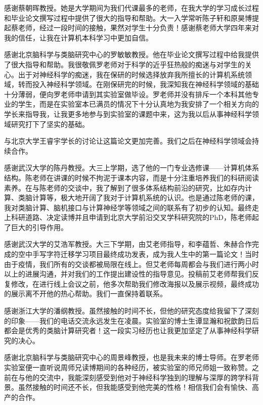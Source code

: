 
\begin{acknowledgements}
  感谢蔡朝晖教授。她是大学期间为我们代课最多的老师，在我大学的学习成长过程和毕业论文撰写过程中提供了很大的指导和帮助。大一入学常听陈子轩和原昊博提起蔡老师，经过一段时间的接触，果然对学生十分负责！感谢蔡老师大学四年来对我的信任，让我在计算机本科学习中更加自信。

  感谢北京脑科学与类脑研究中心的罗敏敏教授。他在毕业论文撰写过程中给我提供了很大指导和帮助。我很敬佩罗老师对于科学的近乎狂热般的痴迷与对学生的关心。出于对神经科学的痴迷，我在保研的时候选择放弃我所擅长的计算机系统领域，转而投入神经科学领域。在刚保研完的时候，我深知我在神经科学领域的基础十分薄弱，便向罗老师申请到其实验室做毕设。罗老师并没有排斥一个本科其他专业的学生，而是在实验室本已满员的情况下十分认真地为我安排了一个相关方向的学长来指导我，让我更多地参与到实验室的课题中来，这为我以后从事神经科学领域研究打下了坚实的基础。

  与北京大学王睿宇学长的讨论让这篇论文更加完善。我们之后在神经科学领域会持续合作。

  感谢武汉大学的陈丹教授。大三上学期，选了他的一门专业选修课——计算机体系结构。陈老师在讲课的时候不拘泥于课本内容，而是十分注重培养我们的科研阅读素养。在与陈老师的交谈中，我了解到了很多体系结构前沿的研究，比如存内计算、类脑计算等，极大地开阔了我对于计算机系统的认识。也是通过陈老师的课，我对类脑计算、脑机接口与计算神经学等领域之间的联系有了初步的认知。最终走上科研道路、决定读博并且申请到北京大学前沿交叉学科研究院的PhD，陈老师起了巨大的引导作用。

  感谢武汉大学的艾浩军教授。大三下学期，由艾老师指导，和李蕴哲、朱赫合作完成的空中手写字符迁移学习项目最终成功发表，成为我人生中的第一篇论文！当时由于疫情，我们所有的交谈都被局限在线上。但艾老师每周都会与我们进行两小时以上的进展沟通，并对我们的工作提出建设性的指导意见。投稿前艾老师帮我们反复修改，在进行线上会议之前，他多次帮助我们修改海报以及展示视频，最终成功的展示离不开他的热心帮助。我们一直保持着联系。

  感谢浙江大学的潘纲教授。虽然接触的时间不长，但他的研究态度给我留下了深刻的印象——我们的电话交流永远发生在凌晨。实验室的博士生谭显瀚和祝歆韵日后都会是优秀的类脑计算研究者！这一段实习经历也让我更加坚定了从事神经科学研究的决心。

  感谢北京脑科学与类脑研究中心的周景峰教授，也是我未来的博士导师。在罗老师实验室便一直听说周师兄读博期间的各种经历，被实验室的师兄师姐一致称赞。之前在与他的交流中，我能深刻感受到他对于神经科学独到的理解与深厚的跨学科背景。虽然接触的时间还不长，但我能感受到他完美的性格！相信我们会有愉快、高产的合作。


\end{acknowledgements}
